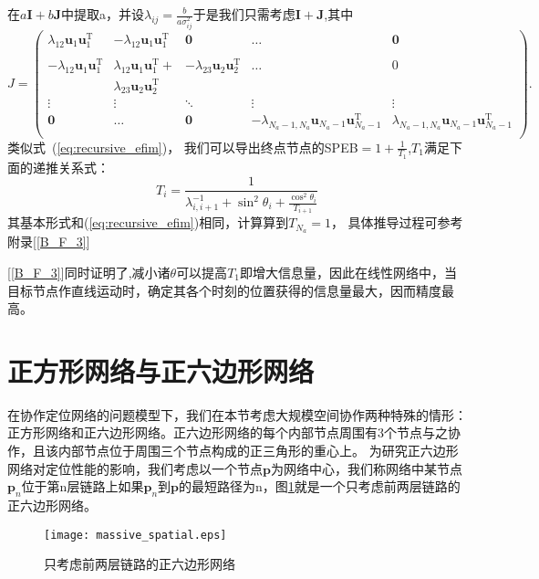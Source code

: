 在$a\bm{I}+b\bm{J}$中提取a，并设$\lambda_{ij}=\frac{b}{a\sigma_{ij}^2}$于是我们只需考虑$\bm{I}+\bm{J}$,其中
\begin{equation}J=\left(
\begin{array}{ccccc}
\lambda_{12}\bm{u}_1\bm{u}_1^{\textrm{T}} &-\lambda_{12}\bm{u}_1\bm{u}_1^{\textrm{T}} &\bm{0}&\dots&\bm{0}\\
&&&&\\
-\lambda_{12}\bm{u}_1\bm{u}_1^{\textrm{T}} &\lambda_{12}\bm{u}_1\bm{u}_1^{\textrm{T}} +&-\lambda_{23}\bm{u}_2\bm{u}_2^{\textrm{T}} &\dots&0\\
&\lambda_{23}\bm{u}_2\bm{u}_2^{\textrm{T}} &&&\\
\vdots &\vdots&\ddots &\vdots&\vdots\\
\bm{0}&\dots&\bm{0}&-\lambda_{N_a-1,N_a}\bm{u}_{N_a-1}\bm{u}_{N_a-1}^{\textrm{T}} &\lambda_{N_a-1,N_a}\bm{u}_{N_a-1}\bm{u}_{N_a-1}^{\textrm{T}} \\
\end{array}
\right).
\end{equation}
类似式~(\ref{eq:recursive_efim})，
我们可以导出终点节点的SPEB$=1+\frac{1}{T_1}$,$T_1$满足下面的递推关系式：
\begin{equation}\label{eq:recursive_efim_second}
  T_i=\frac{1}{\lambda_{i,i+1}^{-1}+\sin^2\theta_i+\frac{\cos^2\theta_i}{T_{i+1}}}
\end{equation}
其基本形式和(\ref{eq:recursive_efim})相同，计算算到$T_{N_a}=1$，
具体推导过程可参考附录[\ref{B_F_3}]

[\ref{B_F_3}]同时证明了,减小诸$\theta$可以提高$T_1$即增大信息量，因此在线性网络中，当目标节点作直线运动时，确定其各个时刻的位置获得的信息量最大，因而精度最高。
\section{正方形网络与正六边形网络}\label{section:square_and_hexagon_network}
在协作定位网络的问题模型下，我们在本节考虑大规模空间协作两种特殊的情形：
正方形网络和正六边形网络。正六边形网络的每个内部节点周围有3个节点与之协作，且该内部节点位于周围三个节点构成的正三角形的重心上。
为研究正六边形网络对定位性能的影响，我们考虑以一个节点$\bm{p}$为网络中心，我们称网络中某节点$\bm{p}_n$位于第n层链路上如果$\bm{p}_n$到$\bm{p}$的最短路径为n，图\ref{HexagonNetwork}就是一个只考虑前两层链路的正六边形网络。
\begin{figure}[h]
  \centering
  \texttt{[image: massive\_spatial.eps]}
  \caption{只考虑前两层链路的正六边形网络}\label{HexagonNetwork}
\end{figure}

